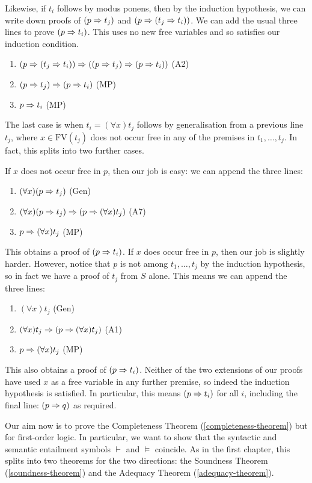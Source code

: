 \documentclass{article}
\begin{document}
\begin{prf}
    Likewise, if $t_i$ follows by modus ponens, then by the induction hypothesis, we can write down proofs of $(p \Rightarrow t_j)$ and $(p \Rightarrow (t_j \Rightarrow t_i))$. We can add the usual three lines to prove $(p \Rightarrow t_i)$. This uses no new free variables and so satisfies our induction condition.
	\begin{enumerate}
    	\item $(p \Rightarrow (t_j \Rightarrow t_i)) \Rightarrow ((p \Rightarrow t_j) \Rightarrow (p \Rightarrow t_i))$ \hfill (A2)
    	\item $(p \Rightarrow t_j) \Rightarrow (p \Rightarrow t_i)$ \hfill (MP)
    	\item $p \Rightarrow t_i$ \hfill (MP)
	\end{enumerate}
    The last case is when $t_i = (\forall x)t_j$ follows by generalisation from a previous line $t_j$, where $x \in \mathrm{FV}(t_j)$ does not occur free in any of the premises in $t_1, \dots, t_j$. In fact, this splits into two further cases.
    
    If $x$ does not occur free in $p$, then our job is easy: we can append the three lines:
    \begin{enumerate}
		\item $(\forall x)(p \Rightarrow t_j)$ \hfill (Gen)
		\item $(\forall x)(p \Rightarrow t_j) \Rightarrow (p \Rightarrow (\forall x)t_j)$ \hfill (A7)
		\item $p \Rightarrow (\forall x)t_j$ \hfill (MP)
	\end{enumerate}
	This obtains a proof of $(p \Rightarrow t_i)$. If $x$ does occur free in $p$, then our job is slightly harder. However, notice that $p$ is not among $t_1, \dots, t_j$ by the induction hypothesis, so in fact we have a proof of $t_j$ from $S$ alone. This means we can append the three lines:
	\begin{enumerate}
	    \item $(\forall x)t_j$ \hfill (Gen)
	    \item $(\forall x)t_j \Rightarrow (p \Rightarrow (\forall x)t_j)$ \hfill (A1)
	    \item $p \Rightarrow (\forall x)t_j$ \hfill(MP)
	\end{enumerate}
	This also obtains a proof of $(p \Rightarrow t_i)$. Neither of the two extensions of our proofs have used $x$ as a free variable in any further premise, so indeed the induction hypothesis is satisfied. In particular, this means $(p \Rightarrow t_i)$ for all $i$, including the final line: $(p \Rightarrow q)$ as required.
\end{prf}

Our aim now is to prove the Completeness Theorem (\ref{completeness-theorem}) but for first-order logic. In particular, we want to show that the syntactic and semantic entailment symbols $\vdash$ and $\vDash$ coincide. As in the first chapter, this splits into two theorems for the two directions: the Soundness Theorem (\ref{soundness-theorem}) and the Adequacy Theorem (\ref{adequacy-theorem}).
\end{document}
